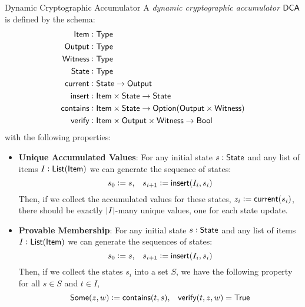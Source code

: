 \begin{definitiontoc}{Dynamic Cryptographic Accumulator}
    A \emph{dynamic cryptographic accumulator} ${\textsf{DCA}}$ is defined by the schema:
    \begin{align*}
        {\textsf{Item}}     &: {\textsf{Type}} \\
        {\textsf{Output}}   &: {\textsf{Type}} \\
        {\textsf{Witness}}  &: {\textsf{Type}} \\
        {\textsf{State}}   &: {\textsf{Type}} \\
        {\textsf{current}}  &: {\textsf{State}} \to {\textsf{Output}} \\
        {\textsf{insert}}  &: {\textsf{Item}} \times {\textsf{State}} \to {\textsf{State}} \\
        {\textsf{contains}} &: {\textsf{Item}} \times {\textsf{State}} \to {\textsf{Option}}({\textsf{Output}} \times {\textsf{Witness}}) \\
        {\textsf{verify}}   &: {\textsf{Item}} \times {\textsf{Output}} \times {\textsf{Witness}} \to {\textsf{Bool}}
    \end{align*}
    with the following properties:
    \begin{itemize}
        \item \textbf{Unique Accumulated Values}: For any initial state $s : {\textsf{State}}$ and any list of items $I : {\textsf{List}}({\textsf{Item}})$ we can generate the sequence of states:
            \[s_0 := s, \,\,\,\,\, s_{i + 1} := {\textsf{insert}}(I_i, s_i)\]
            Then, if we collect the accumulated values for these states, $z_i := {\textsf{current}}(s_i)$, there should be exactly $\left|I\right|$-many unique values, one for each state update.
        \item \textbf{Provable Membership}: For any initial state $s : {\textsf{State}}$ and any list of items $I : {\textsf{List}}({\textsf{Item}})$ we can generate the sequences of states:
            \[s_0 := s, \,\,\,\,\, s_{i + 1} := {\textsf{insert}}(I_i, s_i)\]
            Then, if we collect the states $s_i$ into a set $S$, we have the following property for all $s \in S$ and $t \in I$,
            \[{\textsf{Some}}(z, w) := {\textsf{contains}}(t, s), \,\,\,\,\, {\textsf{verify}}(t, z, w) = {\textsf{True}}\]
    \end{itemize}
\end{definitiontoc}

